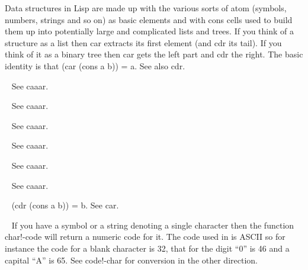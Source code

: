 \begin{description}
Data structures in Lisp are made up with the various sorts of atom (symbols,
numbers, strings and so on) as basic elements and with {\tx cons} cells
used to build them up into potentially large and complicated lists and trees.
If you think of a structure as a list then {\tx car} extracts its first
element (and {\tx cdr} its tail). If you think of it as a binary
tree then {\tx car} gets the left part and {\tx cdr} the right.
The basic identity is that {\tx (car (cons a b))} = {\tx a}.
See also {\tx cdr}.
\item[{\tx cdaar~~~~~~~~} \hspace{1cm} {\em function 1 arg}]~\newline
See {\tx caaar}.
\item[{\tx cdadr~~~~~~~~} \hspace{1cm} {\em function 1 arg}]~\newline
See {\tx caaar}.
\item[{\tx cdar~~~~~~~~~} \hspace{1cm} {\em function 1 arg}]~\newline
See {\tx caaar}.
\item[{\tx cddar~~~~~~~~} \hspace{1cm} {\em function 1 arg}]~\newline
See {\tx caaar}.
\item[{\tx cdddr~~~~~~~~} \hspace{1cm} {\em function 1 arg}]~\newline
See {\tx caaar}.
\item[{\tx cddr~~~~~~~~~} \hspace{1cm} {\em function 1 arg}]~\newline
See {\tx caaar}.
\item[{\tx cdr~~~~~~~~~~} \hspace{1cm} {\em function 1 arg}]~\newline
{\tx (cdr (cons a b))} = {\tx b}. See {\tx car}.
\item[{\tx char!-code~~~} \hspace{1cm} {\em function 1 arg}]~\newline
If you have a symbol or a string denoting a single character then the function
{\tx char!-code} will return a numeric code for it. The code used in
\vsl{} is ASCII so for instance the code for a blank character is 32, that for
the digit ``0'' is 46 and a capital ``A'' is 65. See {\tx code!-char} for
conversion in the other direction.

\end{description}
